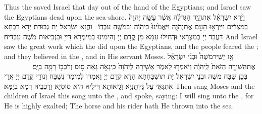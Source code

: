 {Thus the \lord\space saved Israel that day out of the hand of the Egyptians; and Israel saw the Egyptians dead upon the sea-shore.}{}
{וַיַּ֨רְא יִשְׂרָאֵ֜ל אֶת\maqqaf הַיָּ֣ד הַגְּדֹלָ֗ה אֲשֶׁ֨ר עָשָׂ֤ה יְהֹוָה֙ בְּמִצְרַ֔יִם וַיִּֽירְא֥וּ הָעָ֖ם אֶת\maqqaf יְהֹוָ֑ה וַיַּֽאֲמִ֙ינוּ֙ בַּֽיהֹוָ֔ה וּבְמֹשֶׁ֖ה עַבְדּֽוֹ׃ \petucha }
{וַחֲזָא יִשְׂרָאֵל יָת גְּבוּרַת יְדָא רַבְּתָא דַּעֲבַד יְיָ בְּמִצְרָאֵי וּדְחִילוּ עַמָּא מִן קֳדָם יְיָ וְהֵימִינוּ בְּמֵימְרָא דַּייָ וּבִנְבִיאוּת מֹשֶׁה עַבְדֵּיהּ׃}
{And Israel saw the great work which the \lord\space did upon the Egyptians, and the people feared the \lord; and they believed in the \lord, and in His servant Moses.}{}
\newperek
{}
{אָ֣ז יָשִֽׁיר\maqqaf מֹשֶׁה֩ וּבְנֵ֨י יִשְׂרָאֵ֜ל אֶת\maqqaf הַשִּׁירָ֤ה הַזֹּאת֙ לַֽיהֹוָ֔ה וַיֹּאמְר֖וּ לֵאמֹ֑ר אָשִׁ֤ירָה לַֽיהֹוָה֙ כִּֽי\maqqaf גָאֹ֣ה גָּאָ֔ה ס֥וּס וְרֹכְב֖וֹ רָמָ֥ה בַיָּֽם׃        }
{בְּכֵן שַׁבַּח מֹשֶׁה וּבְנֵי יִשְׂרָאֵל יָת תּוּשְׁבַּחְתָּא הָדָא קֳדָם יְיָ וַאֲמַרוּ לְמֵימַר נְשַׁבַּח וְנוֹדֵי קֳדָם יְיָ אֲרֵי אִתְגְּאִי עַל גֵּיוְתָנַיָּא וְגֵיאוּתָא דִּילֵיהּ הִיא סוּסְיָא וְרָכְבֵיהּ רְמָא בְיַמָּא׃}
{Then sang Moses and the children of Israel this song unto the \lord, and spoke, saying: I will sing unto the \lord, for He is highly exalted; The horse and his rider hath He thrown into the sea.}{}
